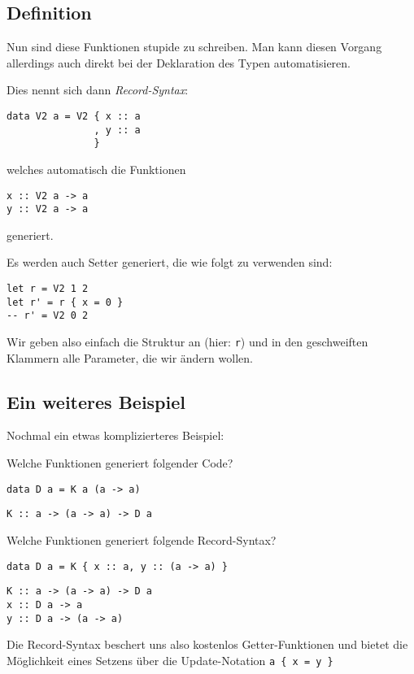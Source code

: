 \documentclass{beamer}
\begin{document}
\subsection{Definition}

\begin{frame}[fragile]
Nun sind diese Funktionen stupide zu schreiben. Man kann diesen Vorgang allerdings auch direkt bei der Deklaration des Typen automatisieren.\\\par
\pause
Dies nennt sich dann \emph{Record-Syntax}:\smallskip

\pause
\begin{verbatim}
data V2 a = V2 { x :: a
               , y :: a
               }
\end{verbatim}
\pause
welches automatisch die Funktionen
\begin{verbatim}
x :: V2 a -> a
y :: V2 a -> a
\end{verbatim}
generiert.
\end{frame}

\begin{frame}[fragile]
Es werden auch Setter generiert, die wie folgt zu verwenden sind: \bigskip
\pause
\begin{verbatim}
let r = V2 1 2
let r' = r { x = 0 }
-- r' = V2 0 2
\end{verbatim}
\pause
\bigskip

Wir geben also einfach die Struktur an (hier: \texttt{r}) und in den geschweiften Klammern alle Parameter, die wir ändern wollen.
\end{frame}

\subsection{Ein weiteres Beispiel}

\begin{frame}[fragile]
Nochmal ein etwas komplizierteres Beispiel:\\\par
\pause
Welche Funktionen generiert folgender Code? \smallskip

\begin{verbatim}
data D a = K a (a -> a)
\end{verbatim}
\pause
\begin{verbatim}
K :: a -> (a -> a) -> D a
\end{verbatim}
\pause
Welche Funktionen generiert folgende Record-Syntax?
\begin{verbatim}
data D a = K { x :: a, y :: (a -> a) }
\end{verbatim}
\pause
\begin{verbatim}
K :: a -> (a -> a) -> D a
x :: D a -> a
y :: D a -> (a -> a)
\end{verbatim}
\pause
Die Record-Syntax beschert uns also kostenlos Getter-Funktionen und bietet die Möglichkeit eines Setzens über die Update-Notation \texttt{a \{ x = y \}}
\end{frame}
\end{document}
